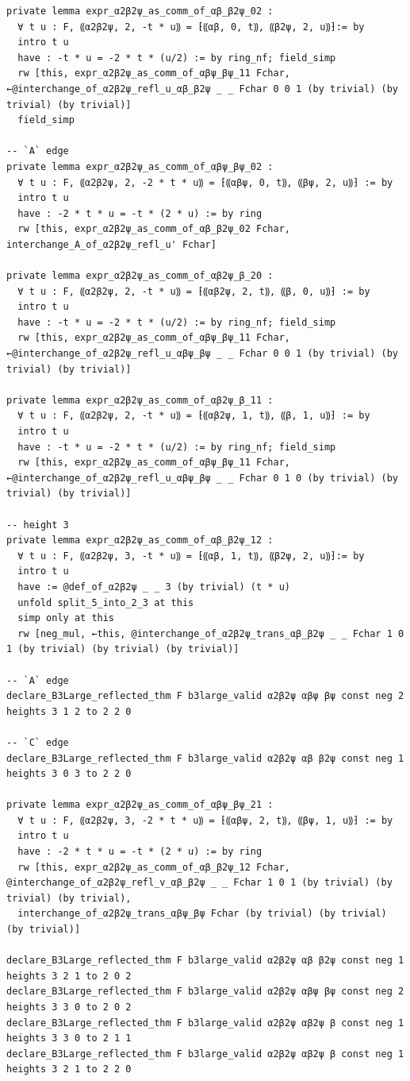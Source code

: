 \begin{Verbatim}
private lemma expr_α2β2ψ_as_comm_of_αβ_β2ψ_02 :
  ∀ t u : F, ⸨α2β2ψ, 2, -t * u⸩ = ⁅⸨αβ, 0, t⸩, ⸨β2ψ, 2, u⸩⁆:= by
  intro t u
  have : -t * u = -2 * t * (u/2) := by ring_nf; field_simp
  rw [this, expr_α2β2ψ_as_comm_of_αβψ_βψ_11 Fchar, ←@interchange_of_α2β2ψ_refl_u_αβ_β2ψ _ _ Fchar 0 0 1 (by trivial) (by trivial) (by trivial)]
  field_simp

-- `A` edge
private lemma expr_α2β2ψ_as_comm_of_αβψ_βψ_02 :
  ∀ t u : F, ⸨α2β2ψ, 2, -2 * t * u⸩ = ⁅⸨αβψ, 0, t⸩, ⸨βψ, 2, u⸩⁆ := by
  intro t u
  have : -2 * t * u = -t * (2 * u) := by ring
  rw [this, expr_α2β2ψ_as_comm_of_αβ_β2ψ_02 Fchar, interchange_A_of_α2β2ψ_refl_u' Fchar]

private lemma expr_α2β2ψ_as_comm_of_αβ2ψ_β_20 :
  ∀ t u : F, ⸨α2β2ψ, 2, -t * u⸩ = ⁅⸨αβ2ψ, 2, t⸩, ⸨β, 0, u⸩⁆ := by
  intro t u
  have : -t * u = -2 * t * (u/2) := by ring_nf; field_simp
  rw [this, expr_α2β2ψ_as_comm_of_αβψ_βψ_11 Fchar, ←@interchange_of_α2β2ψ_refl_u_αβψ_βψ _ _ Fchar 0 0 1 (by trivial) (by trivial) (by trivial)]

private lemma expr_α2β2ψ_as_comm_of_αβ2ψ_β_11 :
  ∀ t u : F, ⸨α2β2ψ, 2, -t * u⸩ = ⁅⸨αβ2ψ, 1, t⸩, ⸨β, 1, u⸩⁆ := by
  intro t u
  have : -t * u = -2 * t * (u/2) := by ring_nf; field_simp
  rw [this, expr_α2β2ψ_as_comm_of_αβψ_βψ_11 Fchar, ←@interchange_of_α2β2ψ_refl_u_αβψ_βψ _ _ Fchar 0 1 0 (by trivial) (by trivial) (by trivial)]

-- height 3
private lemma expr_α2β2ψ_as_comm_of_αβ_β2ψ_12 :
  ∀ t u : F, ⸨α2β2ψ, 3, -t * u⸩ = ⁅⸨αβ, 1, t⸩, ⸨β2ψ, 2, u⸩⁆:= by
  intro t u
  have := @def_of_α2β2ψ _ _ 3 (by trivial) (t * u)
  unfold split_5_into_2_3 at this
  simp only at this
  rw [neg_mul, ←this, @interchange_of_α2β2ψ_trans_αβ_β2ψ _ _ Fchar 1 0 1 (by trivial) (by trivial) (by trivial)]

-- `A` edge
declare_B3Large_reflected_thm F b3large_valid α2β2ψ αβψ βψ const neg 2 heights 3 1 2 to 2 2 0

-- `C` edge
declare_B3Large_reflected_thm F b3large_valid α2β2ψ αβ β2ψ const neg 1 heights 3 0 3 to 2 2 0

private lemma expr_α2β2ψ_as_comm_of_αβψ_βψ_21 :
  ∀ t u : F, ⸨α2β2ψ, 3, -2 * t * u⸩ = ⁅⸨αβψ, 2, t⸩, ⸨βψ, 1, u⸩⁆ := by
  intro t u
  have : -2 * t * u = -t * (2 * u) := by ring
  rw [this, expr_α2β2ψ_as_comm_of_αβ_β2ψ_12 Fchar, @interchange_of_α2β2ψ_refl_v_αβ_β2ψ _ _ Fchar 1 0 1 (by trivial) (by trivial) (by trivial),
  interchange_of_α2β2ψ_trans_αβψ_βψ Fchar (by trivial) (by trivial) (by trivial)]

declare_B3Large_reflected_thm F b3large_valid α2β2ψ αβ β2ψ const neg 1 heights 3 2 1 to 2 0 2
declare_B3Large_reflected_thm F b3large_valid α2β2ψ αβψ βψ const neg 2 heights 3 3 0 to 2 0 2
declare_B3Large_reflected_thm F b3large_valid α2β2ψ αβ2ψ β const neg 1 heights 3 3 0 to 2 1 1
declare_B3Large_reflected_thm F b3large_valid α2β2ψ αβ2ψ β const neg 1 heights 3 2 1 to 2 2 0


\end{Verbatim}
